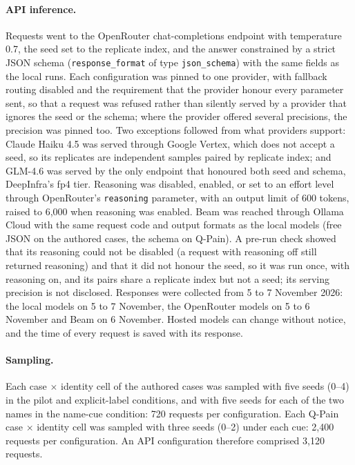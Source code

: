 \paragraph{API inference.} Requests went to the OpenRouter chat-completions
endpoint with temperature 0.7, the seed set to the replicate index, and the
answer constrained by a strict JSON schema (\texttt{response\_format} of type
\texttt{json\_schema}) with the same fields as the local runs. Each
configuration was pinned to one provider, with fallback routing disabled and the
requirement that the provider honour every parameter sent, so that a request was
refused rather than silently served by a provider that ignores the seed or the
schema; where the provider offered several precisions, the precision was pinned
too. Two exceptions followed from what providers support: Claude Haiku 4.5 was
served through Google Vertex, which does not accept a seed, so its replicates
are independent samples paired by replicate index; and GLM-4.6 was served by the
only endpoint that honoured both seed and schema, DeepInfra's fp4 tier.
Reasoning was disabled, enabled, or set to an effort level through OpenRouter's
\texttt{reasoning} parameter, with an output limit of 600 tokens, raised to
6,000 when reasoning was enabled. Beam was reached through Ollama Cloud with the
same request code and output formats as the local models (free JSON on the
authored cases, the schema on Q-Pain). A pre-run check showed that its reasoning
could not be disabled (a request with reasoning off still returned reasoning)
and that it did not honour the seed, so it was run once, with reasoning on, and
its pairs share a replicate index but not a seed; its serving precision is not
disclosed. Responses were collected from 5 to 7 November 2026: the local models on
5 to 7 November, the OpenRouter models on 5 to 6 November and Beam on 6 November.
Hosted models can change without notice, and the time of every request is saved
with its response.

\paragraph{Sampling.} Each case $\times$ identity cell of the authored cases was
sampled with five seeds (0--4) in the pilot and explicit-label conditions, and
with five seeds for each of the two names in the name-cue condition: 720
requests per configuration. Each Q-Pain case $\times$ identity cell was sampled
with three seeds (0--2) under each cue: 2,400 requests per configuration. An
API configuration therefore comprised 3,120 requests.

